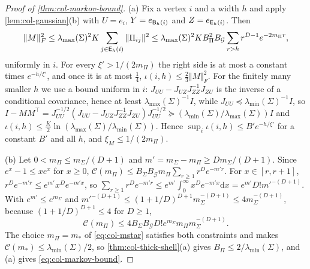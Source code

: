 \begin{proof}[Proof of \cref{thm:col-markov-bound}]
(a) Fix a vertex $i$ and a width $h$ and apply \cref{lem:col-gaussian}(b) with $U=e_i$, $Y=e_{\mathsf{B}_h(i)}$ and $Z=e_{\mathsf{E}_h(i)}$. Then
\[
\Vert M\Vert_F^2\le\lambda_{\max}(\Sigma)^2K\sum_{j\in\mathsf{E}_h(i)}\Vert\Pi_{ij}\Vert^2\le\lambda_{\max}(\Sigma)^2KB_\Pi^2B_{\mathcal G}\sum_{r>h}r^{D-1}e^{-2m_\Pi r},
\]
uniformly in $i$. For every $\xi'>1/(2m_\Pi)$ the right side is at most a constant times $e^{-h/\xi'}$, and once it is at most $\frac14$, $\iota(i,h)\le\frac23\Vert M\Vert_F^2$. For the finitely many smaller $h$ we use a bound uniform in $i$: $J_{UU}-J_{UZ}J_{ZZ}^{-1}J_{ZU}$ is the inverse of a conditional covariance, hence at least $\lambda_{\max}(\Sigma)^{-1}I$, while $J_{UU}\preceq\lambda_{\min}(\Sigma)^{-1}I$, so $I-MM^\top=J_{UU}^{-1/2}(J_{UU}-J_{UZ}J_{ZZ}^{-1}J_{ZU})J_{UU}^{-1/2}\succeq(\lambda_{\min}(\Sigma)/\lambda_{\max}(\Sigma))I$ and $\iota(i,h)\le\frac K2\ln(\lambda_{\max}(\Sigma)/\lambda_{\min}(\Sigma))$. Hence $\sup_i\iota(i,h)\le B'e^{-h/\xi'}$ for a constant $B'$ and all $h$, and $\xi_M\le1/(2m_\Pi)$.

(b) Let $0<m_\Pi\le m_\Sigma/(D+1)$ and $m'=m_\Sigma-m_\Pi\ge Dm_\Sigma/(D+1)$. Since $e^x-1\le xe^x$ for $x\ge0$, $\mathcal C(m_\Pi)\le B_\Sigma B_{\mathcal G}m_\Pi\sum_{r\ge1}r^De^{-m'r}$. For $x\in[r,r+1]$, $r^De^{-m'r}\le e^{m'}x^De^{-m'x}$, so $\sum_{r\ge1}r^De^{-m'r}\le e^{m'}\int_0^\infty x^De^{-m'x}\mathrm{d}x=e^{m'}D!m'^{-(D+1)}$. With $e^{m'}\le e^{m_\Sigma}$ and $m'^{-(D+1)}\le(1+1/D)^{D+1}m_\Sigma^{-(D+1)}\le4m_\Sigma^{-(D+1)}$, because $(1+1/D)^{D+1}\le4$ for $D\ge1$,
\[
\mathcal C(m_\Pi)\le4B_\Sigma B_{\mathcal G}D!e^{m_\Sigma}m_\Pi m_\Sigma^{-(D+1)}.
\]
The choice $m_\Pi=m_*$ of \eqref{eq:col-mstar} satisfies both constraints and makes $\mathcal C(m_*)\le\lambda_{\min}(\Sigma)/2$, so \cref{thm:col-thick-shell}(a) gives $B_\Pi\le2/\lambda_{\min}(\Sigma)$, and (a) gives \eqref{eq:col-markov-bound}.


\end{proof}
